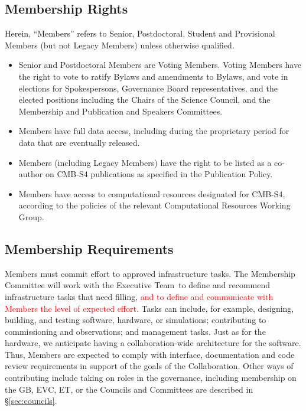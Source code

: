 \documentclass[12pt]{article}
\newcommand{\exec}{{Executive Team}}
\begin{document}
\subsection{Membership Rights}\label{sec:memberrights}

Herein, ``Members'' refers to Senior, Postdoctoral, Student and Provisional Members (but not Legacy Members) unless otherwise qualified.  

\begin{itemize}

\item Senior and Postdoctoral Members are Voting Members.  Voting Members  have the right to vote to ratify Bylaws and amendments to Bylaws, and vote in elections for Spokespersons, Governance Board representatives, and the elected positions including the Chairs of the Science Council, and the Membership and Publication and Speakers Committees.  %

\item Members have full data access, including during the proprietary period for data that are eventually released.

\item Members (including Legacy Members) have the right to be listed as a co-author on CMB-S4 publications as specified in the Publication Policy.

\item Members have access to computational resources designated for CMB-S4, according to the policies of the relevant Computational Resources Working Group.

\end{itemize}

\subsection{Membership Requirements}

 Members must commit effort to approved infrastructure tasks.   
The Membership Committee will work with the \exec\ to define and recommend infrastructure tasks that need filling, 
\textcolor{red}{ and to define and communicate with Members the level of expected effort.}
Tasks can include,  for example, designing, building, and testing software, hardware, or simulations; contributing to commissioning and observations; and management tasks. 
Just as for the hardware, we anticipate having a collaboration-wide architecture for the software.  Thus, Members are expected to comply with interface, documentation and code review requirements in support of the goals of the Collaboration.   Other ways of contributing include taking on roles in the governance, including membership on the GB, EVC, ET, or the Councils and Committees are described in \S\ref{sec:councils}.
\end{document}
